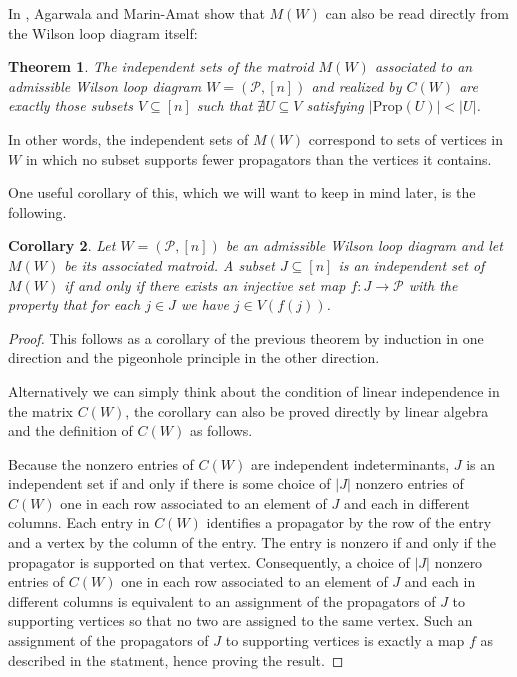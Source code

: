 \documentclass[11pt]{article}
\newcommand{\cP}{\mathcal{P}}
\newcommand{\Prop}{\textrm{Prop}}
\newtheorem{thm}{Theorem}[section]
\newtheorem{cor}[thm]{Corollary}
\theoremstyle{remark}
\theoremstyle{definition}
\begin{document}
In \cite{wilsonloop}, Agarwala and Marin-Amat show that $M(W)$ can also be read directly from the Wilson loop diagram itself:

\begin{thm} \label{thm WLD defines matroid} \cite[Theorem 3.6]{wilsonloop} The independent sets of the matroid $M(W)$ associated to an admissible Wilson loop diagram $W = (\cP,[n])$ and realized by $C(W)$ are exactly those subsets $V \subseteq [n]$ such that $\nexists U\subseteq V$ satisfying $|\Prop(U)| < |U|$. \end{thm}
In other words, the independent sets of $M(W)$ correspond to sets of vertices in $W$ in which no subset supports fewer propagators than the vertices it contains.

One useful corollary of this, which we will want to keep in mind later, is the following.
\begin{cor}\label{lem basis as perm}
Let $W = (\cP,[n])$ be an admissible Wilson loop diagram and let $M(W)$ be its associated matroid. A subset $J \subseteq [n]$ is an independent set of $M(W)$ if and only if there exists an injective set map $f : J \rightarrow \cP$ with the property that for each $j\in J$ we have $j \in V(f(j))$.
\end{cor}

\begin{proof}
  This follows as a corollary of the previous theorem by induction in one direction and the pigeonhole principle in the other direction.  

  Alternatively we can simply think about the condition of linear independence in the matrix $C(W)$, the corollary can also be proved directly by linear algebra and the definition of $C(W)$ as follows.

  Because the nonzero entries of $C(W)$ are independent indeterminants, $J$ is an independent set if and only if there is some choice of $|J|$ nonzero entries of $C(W)$ one in each row associated to an element of $J$ and each in different columns. Each entry in $C(W)$ identifies a propagator by the row of the entry and a vertex by the column of the entry.  The entry is nonzero if and only if the propagator is supported on that vertex.  Consequently, a choice of $|J|$ nonzero entries of $C(W)$ one in each row associated to an element of $J$ and each in different columns is equivalent to an assignment of the propagators of $J$ to supporting vertices so that no two are assigned to the same vertex.  Such an assignment of the propagators of $J$ to supporting vertices is exactly a map $f$ as described in the statment, hence proving the result.
\end{proof}
\end{document}
